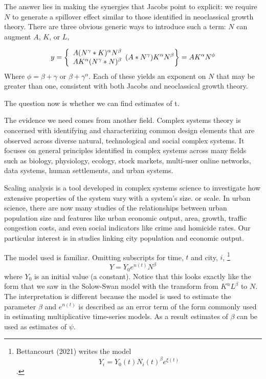 The answer lies in making the synergies that Jacobs point to explicit: we require $N$ to generate a spillover effect similar to those  identified in neoclassical growth theory. There are three obvious generic ways to introduce such a term: $N$ can augment $A$, $K$, or $L$, 

\begin{equation}
  y=\left\{
  \begin{array}{l}
    A (N^\gamma* K)^\alpha  N^\beta\\
    A K^\alpha (N^\gamma* N)^\beta
  \end{array}
     (A*N^\gamma) K^\alpha N^\beta\\
  \right\} =  AK^\alpha N^\phi
\end{equation}    
Where $\phi=\beta +\gamma$ or $\beta +\gamma^\alpha$. Each of these yields an exponent on $N$ that may be greater than one, consistent with both Jacobs and neoclassical growth theory. 

The question now is whether we can find estimates of t.

The evidence we need comes from another field. Complex systems theory is concerned with identifying and characterizing common design elements that are observed across diverse natural, technological and social complex systems. It focuses on general principles  identified in complex systems across many fields such as biology, physiology, ecology, stock markets, multi-user online  networks, data systems, human settlements, and urban systems.

Scaling analysis is a tool developed in complex systems science to investigate how extensive properties of the system vary with a system's size.  or scale.  In urban science, there are now many studies of  the relationships between urban population size and  features like urban economic output,  area, growth, traffic congestion costs, and even social  indicators like crime and homicide rates. Our particular interest is in studies linking city population  and  economic output. 

The model used is familiar. Omitting subscripts for time, $t$ and city, $i$, \footnote{Bettancourt (2021) writes the model \[Y_i = Y_0(t)N_i(t)^\beta e^{\xi(t)}\].}
\[Y = Y_0e^{n(t)}N^\beta\]
where $Y_0$ is an initial value (a constant). Notice that this looks exactly like the form that we saw in the 
\gls{Solow-Swan model} with the transform from $K^\alpha L^\beta$ to $N$.  The interpretation is different because the model is used to estimate the parameter $\beta$ and $e^{n(t)}$ is described  as an error term of the form commonly used in estimating multiplicative time-series models. As a result estimates of $\beta$  can be used as estimates  of $\psi$.

